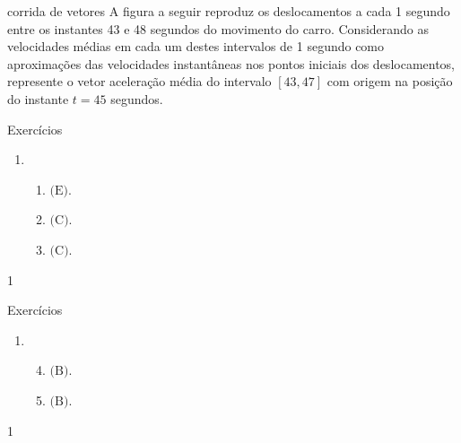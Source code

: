 \begin{task}{ corrida de vetores}
A figura a seguir reproduz os deslocamentos a cada 1 segundo entre os instantes 43 e 48 segundos do movimento do carro.
Considerando as velocidades médias em cada um destes intervalos de 1 segundo como aproximações das velocidades instantâneas nos pontos iniciais dos deslocamentos, represente o vetor aceleração média do intervalo \([43,47]\) com origem na posição do instante \(t=45\) segundos.
\begin{center}\end{center}\end{task}




\exercise

\begin{answer}{Exercícios}
{\exerciselist
\begin{enumerate}
\item 
\begin{enumerate}

\item {} 
\(\text{(E)}\).

\item {} 
\(\text{(C)}\).

\item {} 
\(\text{(C)}\).
\end{enumerate}
\end{enumerate}
}{1}
\end{answer}
\clearmargin

\begin{answer}{Exercícios}
{\exerciselist
\begin{enumerate}
\item 
\begin{enumerate}\setcounter{enumii}{3}
\item {} 
\(\text{(B)}\).

\item {} 
\(\text{(B)}\).
\end{enumerate}
\end{enumerate}
}{1}
\end{answer}
\clearmargin

